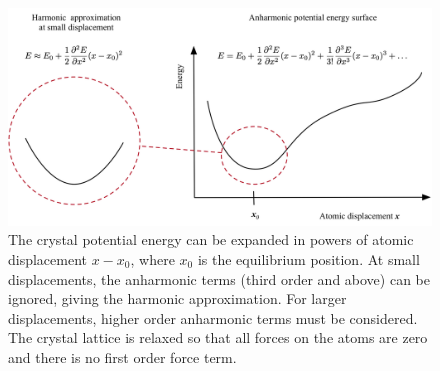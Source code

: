 \begin{figure}[h]
\centering
  \includegraphics[width=0.8\columnwidth]{figures/ch3/harmonicregime.png}
  \caption[Crystal potential energy expanded with respect to atomic displacement]{The crystal potential energy can be expanded in powers of atomic displacement $x-x_0$, where $x_0$ is the equilibrium position. At small displacements, the anharmonic terms (third order and above) can be ignored, giving the harmonic approximation. For larger displacements, higher order anharmonic terms must be considered. The crystal lattice is relaxed so that all forces on the atoms are zero and there is no first order force term.}
  \label{harmonicregime}
\end{figure}





